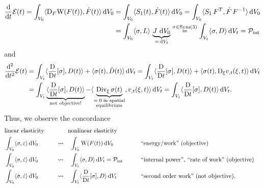 \documentclass[10pt]{article}
\numberwithin{theoremCounter}{section}
\theoremstyle{plain}
\theoremstyle{definition}
\newcommand{\DD}{\mathrm{D}}
\newcommand{\WW}{\mathrm{W}}
\newcommand*\dif{\mathop{}\!\mathrm{d}}
\DeclareMathOperator{\Sym}{Sym}
\numberwithin{equation}{section}
\begin{document}
\begin{appendix}
	\begin{equation}
	\label{eqPenergy}
	\begin{alignedat}{2}
	\frac{\dif}{\dif t} \mathcal{E}(t) = \int_{V_0} \langle \DD_F \WW(F(t)), \dot F(t) \rangle \dif V_0 &= \int_{V_0} \langle S_1(t), \dot F(t) \rangle \dif V_0 = \int_{V_0} \langle S_1 \, F^T, \dot F \, F^{-1} \rangle \dif V_0 \\
	&= \int_{V_0} \langle \sigma, L \rangle \, \underbrace{J \, \dif V_0}_{= \, \dif V_t} \overset{\sigma \in \Sym(3)}{=} \int_{V_t} \langle \sigma, D \rangle \dif V_t = \mathcal{P}_{\textnormal{int}}
	\end{alignedat}
	\end{equation}
and
	\begin{equation}
	\begin{alignedat}{2}
	\frac{\dif^2}{\dif t^2} \mathcal{E}(t) &= \int_{V_t} \langle \frac{\DD}{\DD t}[\sigma], D(t) \rangle + \langle \sigma(t), \dot{D}(t) \rangle \dif V_t = \int_{V_t} \langle \frac{\DD}{\DD t}[\sigma] , D(t) \rangle + \langle \sigma(t) , \DD_{\xi} v_{,t}(\xi,t) \rangle \dif V_t \\
	&= \int_{V_t} \underbrace{\langle \frac{\DD}{\DD t}[\sigma] , D(t) \rangle}_{\textnormal{not objective!}} - \langle \underbrace{\textnormal{Div}_{\xi} \, \sigma(t)}_{\substack{= \; 0 \; \textnormal{in spatial} \\ \textnormal{equilibrium}}}, v_{,t}(\xi,t) \rangle \dif V_t = \int_{V_t} \langle \frac{\DD}{\DD t}[\sigma], D(t) \rangle \dif V_t .
	\end{alignedat}
	\end{equation}
Thus, we observe the concordance
	\begin{align*}
	\textnormal{linear elasticity} & &&  & & \qquad \textnormal{nonlinear elasticity} \\
	\int_{V_0} \langle \sigma, \varepsilon \rangle \dif V_0 \quad & &&  & & \rightsquigarrow \quad \int_{V_0} \WW(F(t)) \dif V_0 &&\qquad \textnormal{``energy/work'' (objective)} \\
	\int_{V_0} \langle \sigma, \dot{\varepsilon} \rangle \dif V_0 \quad & &&  & &\rightsquigarrow \quad \int_{V_t} \langle \sigma, D \rangle \dif V_t = \mathcal{P}_{\textnormal{int}} &&\qquad \textnormal{``internal power'', ``rate of work'' (objective)} \\
	\int_{V_0} \langle \dot{\sigma}, \dot{\varepsilon} \rangle \dif V_0 \quad & &&  & &\rightsquigarrow \quad \int_{V_t} \langle \frac{\DD}{\DD t}[\sigma], D \rangle \dif V_t &&\qquad \textnormal{``second order work'' (not objective).} 

\end{align*}
\end{appendix}
\end{document}
